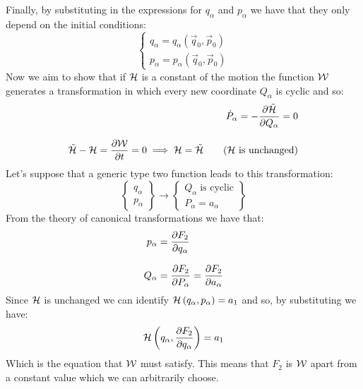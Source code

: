 Finally, by substituting in the expressions for $q_{\alpha}$ and $p_{\alpha}$ we have that they only depend on the initial conditions:
\begin{equation}
  \begin{cases}
    q_{\alpha} = q_{\alpha}(\vec{q}_0,\vec{p}_0)\\[8pt]
    p_{\alpha} = p_{\alpha}(\vec{q}_0,\vec{p}_0)
  \end{cases}
\end{equation}
Now we aim to show that if $\mathcal{H}$ is a constant of the motion the function $\mathcal{W}$ generates a transformation in which every new coordinate $Q_{\alpha}$ is cyclic and so:
\begin{equation}
  \begin{split}
    \dot{P}_{\alpha} = -\pdv{\tilde{\hamfun}}{Q_{\alpha}} = 0\\[8pt]
    \tilde{\hamfun} - \hamfun = \pdv{\hamch}{t} = 0 \implies \hamfun = \tilde{\hamfun} \quad \quad (\hamfun \text{ is unchanged})
  \end{split}
\end{equation}
Let's suppose that a generic type two function leads to this transformation:
\begin{equation}
  \begin{Bmatrix}
    q_{\alpha}\\
    p_{\alpha}
  \end{Bmatrix} \longrightarrow
  \begin{Bmatrix}
    Q_{\alpha} \; \text{is cyclic}\\
    P_{\alpha} = a_{\alpha}
  \end{Bmatrix}
\end{equation}
From the theory of canonical transformations we have that:
\begin{equation}
  \begin{split}
    p_{\alpha} &= \pdv{F_2}{q_{\alpha}}\\[8pt]
    Q_{\alpha} &= \pdv{F_2}{P_{\alpha}} = \pdv{F_2}{a_{\alpha}}
  \end{split}
\end{equation}
Since $\mathcal{H}$ is unchanged we can identify $\mathcal{H} \left(q_{\alpha},p_{\alpha}\right)= a_1$ and so, by substituting we have:
\begin{equation}
  \hamfun \brackets{q_{\alpha},\pdv{F_2}{q_{\alpha}}}= a_1
\end{equation}
Which is the equation that $\mathcal{W}$ must satisfy. This means that $F_2$ is $\mathcal{W}$ apart from a constant value which we can arbitrarily choose.\\
